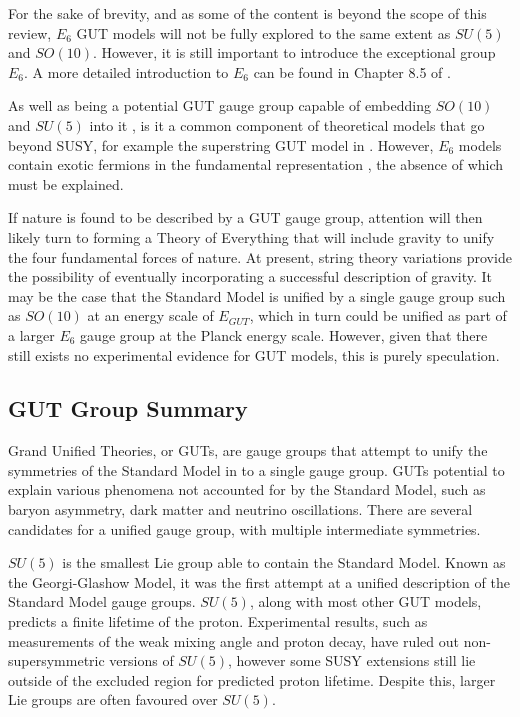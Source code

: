 \documentclass{article}
\begin{document}

For the sake of brevity, and as some of the content is beyond the scope of this review, $E_6$ GUT models will not be fully explored to the same extent as $SU(5)$ and $SO(10)$. However, it is still important to introduce the exceptional group $E_6$. A more detailed introduction to $E_6$ can be found in Chapter 8.5 of \cite{E6TextBook}.

As well as being a potential GUT gauge group capable of embedding $SO(10)$ and $SU(5)$ into it \cite{E6ContainSO10}, is it a common component of theoretical models that go beyond SUSY, for example the superstring GUT model in \cite{E6String}. However, $E_6$ models contain exotic fermions in the fundamental representation \cite{E6TextBook}, the absence of which must be explained.

If nature is found to be described by a GUT gauge group, attention will then likely turn to forming a Theory of Everything that will include gravity to unify the four fundamental forces of nature. At present, string theory variations provide the possibility of eventually incorporating a successful description of gravity. It may be the case that the Standard Model is unified by a single gauge group such as $SO(10)$	at an energy scale of $E_{GUT}$, which in turn could be unified as part of a larger $E_6$ gauge group at the Planck energy scale. However, given that there still exists no experimental evidence for GUT models, this is purely speculation.

\subsection{GUT Group Summary}%
\label{sec:GUT_Summary}

Grand Unified Theories, or GUTs, are gauge groups that attempt to unify the symmetries of the Standard Model in to a single gauge group. GUTs potential to explain various phenomena not accounted for by the Standard Model, such as baryon asymmetry, dark matter and neutrino oscillations. 
There are several candidates for a unified gauge group, with multiple intermediate symmetries. 

$SU(5)$ is the smallest Lie group able to contain the Standard Model. Known as the Georgi-Glashow Model, it was the first attempt at a unified description of the Standard Model gauge groups. $SU(5)$, along with most other GUT models, predicts a finite lifetime of the proton. Experimental results, such as measurements of the weak mixing angle and proton decay, have ruled out non-supersymmetric versions of $SU(5)$, however some SUSY extensions still lie outside of the excluded region for predicted proton lifetime. Despite this, larger Lie groups are often favoured over $SU(5)$.
\end{document}
